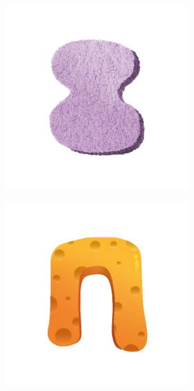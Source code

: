 \begin{figure}[h!]
\begin{center}
\begin{subfigure}[b]{0.3\textwidth}
\begin{center}
\begin{subfigure}[b]{0.4\textwidth}
                    \includegraphics[width=\linewidth]{figures/artist_objects/fake5_carpet_purple.jpg}
                \end{subfigure}
            \end{center}
        \end{subfigure}
        \begin{subfigure}[b]{0.3\textwidth}
            \begin{center}
                \begin{subfigure}[b]{0.4\textwidth}
                    \includegraphics[width=\linewidth]{figures/artist_objects/fake4_sponge_orange.jpg}

\end{subfigure}
\end{center}
\end{subfigure}
\end{center}
\end{figure}

